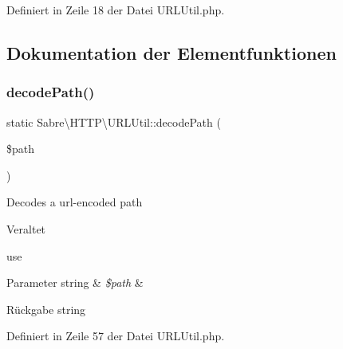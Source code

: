 Definiert in Zeile 18 der Datei U\+R\+L\+Util.\+php.



\subsection{Dokumentation der Elementfunktionen}
\mbox{\label{class_sabre_1_1_h_t_t_p_1_1_u_r_l_util_aad9df2cd589046fb554c917c86c34458}} 
\subsubsection{\texorpdfstring{decode\+Path()}{decodePath()}}
{\footnotesize\ttfamily static Sabre\textbackslash{}\+H\+T\+T\+P\textbackslash{}\+U\+R\+L\+Util\+::decode\+Path (\begin{DoxyParamCaption}\item[{}]{\$path }\end{DoxyParamCaption})\hspace{0.3cm}{\ttfamily [static]}}

Decodes a url-\/encoded path

\begin{DoxyRefDesc}{Veraltet}
\item[\mbox{\hyperlink{deprecated__deprecated000052}{Veraltet}}]use  \end{DoxyRefDesc}

\begin{DoxyParams}[1]{Parameter}
string & {\em \$path} & \\
\hline
\end{DoxyParams}
\begin{DoxyReturn}{Rückgabe}
string 
\end{DoxyReturn}


Definiert in Zeile 57 der Datei U\+R\+L\+Util.\+php.

\mbox{\label{class_sabre_1_1_h_t_t_p_1_1_u_r_l_util_a3f9690f1baca0a99f0ee9647d266932f}} 
